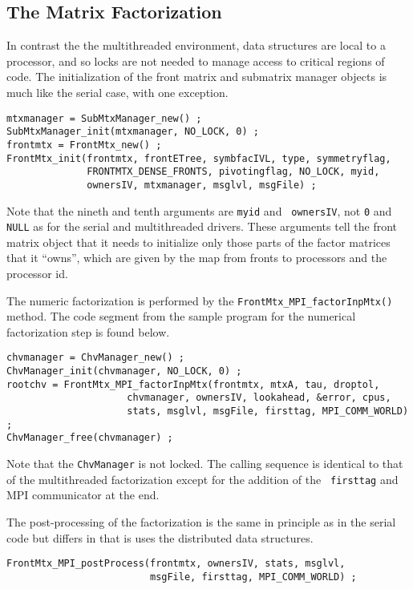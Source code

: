 \subsection{The Matrix Factorization}
\label{subsection:MPI:factor}
\par
In contrast the the multithreaded environment, data structures are
local to a processor, and so locks are not needed to manage access
to critical regions of code.
The initialization of the front matrix and submatrix manager
objects is much like the serial case, with one exception.
\par
\begin{verbatim}
mtxmanager = SubMtxManager_new() ;
SubMtxManager_init(mtxmanager, NO_LOCK, 0) ;
frontmtx = FrontMtx_new() ;
FrontMtx_init(frontmtx, frontETree, symbfacIVL, type, symmetryflag,
              FRONTMTX_DENSE_FRONTS, pivotingflag, NO_LOCK, myid,
              ownersIV, mtxmanager, msglvl, msgFile) ;
\end{verbatim}
Note that the nineth and tenth arguments are {\tt myid} and {\tt
ownersIV}, not {\tt 0} and {\tt NULL} as for the serial and
multithreaded drivers.
These arguments tell the front matrix object 
that it needs to initialize only
those parts of the factor matrices that it ``owns'', 
which are given by the map from fronts to processors 
and the processor id.
\par
The numeric factorization is performed by the
{\tt FrontMtx\_MPI\_factorInpMtx()} method.
The code segment from the sample program for the numerical
factorization step is found below.
\begin{verbatim}
chvmanager = ChvManager_new() ;
ChvManager_init(chvmanager, NO_LOCK, 0) ;
rootchv = FrontMtx_MPI_factorInpMtx(frontmtx, mtxA, tau, droptol,
                     chvmanager, ownersIV, lookahead, &error, cpus,
                     stats, msglvl, msgFile, firsttag, MPI_COMM_WORLD) ;
ChvManager_free(chvmanager) ;
\end{verbatim}
Note that the {\tt ChvManager} is not locked.
The calling sequence is identical to that of 
the multithreaded factorization except for the addition of the {\tt
firsttag} and MPI communicator at the end.
\par
The post-processing of the factorization is the same in principle
as in the serial code but differs in that is uses the distributed
data structures.
\begin{verbatim}
FrontMtx_MPI_postProcess(frontmtx, ownersIV, stats, msglvl,
                         msgFile, firsttag, MPI_COMM_WORLD) ;
\end{verbatim}
